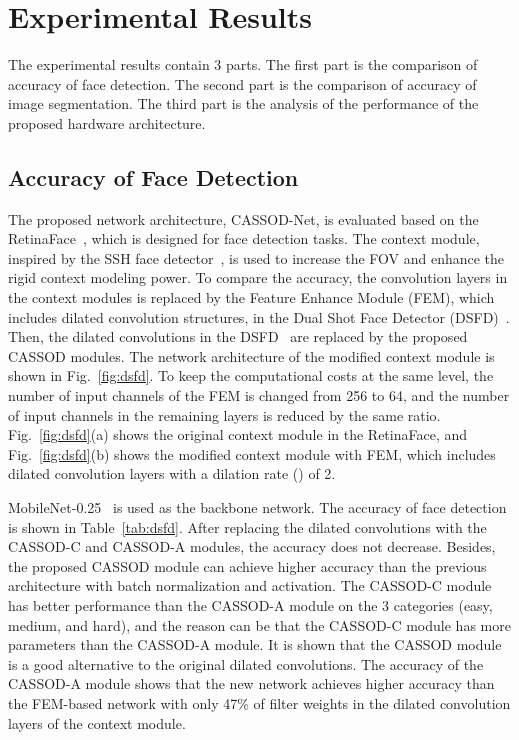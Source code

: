 \documentclass[10pt,twocolumn,letterpaper]{article}
\begin{document}
\section{Experimental Results}
\label{sec:results}

The experimental results contain 3 parts. The first part is the comparison of accuracy of face detection. The second part is the comparison of accuracy of image segmentation. The third part is the analysis of the performance of the proposed hardware architecture.



\subsection{Accuracy of Face Detection}
\label{subsec:face}

The proposed network architecture, CASSOD-Net, is evaluated based on the RetinaFace~\cite{Deng19}, which is designed for face detection tasks. The context module, inspired by the SSH face detector~\cite{Najibi17}, is used to increase the FOV and enhance the rigid context modeling power. To compare the accuracy, the convolution layers in the context modules is replaced by the Feature Enhance Module (FEM), which  includes dilated convolution structures, in the Dual Shot Face Detector (DSFD)~\cite{Li18_1}. Then, the dilated convolutions in the DSFD~\cite{Wu19} are replaced by the proposed CASSOD modules. The network architecture of the modified context module is shown in Fig.~\ref{fig:dsfd}. To keep the computational costs at the same level, the number of input channels of the FEM is changed from 256 to 64, and the number of input channels in the remaining layers is reduced by the same ratio. Fig.~\ref{fig:dsfd}(a) shows the original context module in the RetinaFace, and Fig.~\ref{fig:dsfd}(b) shows the modified context module with FEM, which includes dilated convolution layers with a dilation rate () of 2.

MobileNet-0.25~\cite{Howard17} is used as the backbone network. The accuracy of face detection is shown in Table~\ref{tab:dsfd}. After replacing the dilated convolutions with the CASSOD-C and CASSOD-A modules, the accuracy does not decrease. Besides, the proposed CASSOD module can achieve higher accuracy than the previous architecture with batch normalization and activation. The CASSOD-C module has better performance than the CASSOD-A module on the 3 categories (easy, medium, and hard), and the reason can be that the CASSOD-C module has more parameters than the CASSOD-A module. It is shown that the CASSOD module is a good alternative to the original dilated convolutions. The accuracy of the CASSOD-A module shows that the new network achieves higher accuracy than the FEM-based network with only 47\% of filter weights in the dilated convolution layers of the context module.
\end{document}
